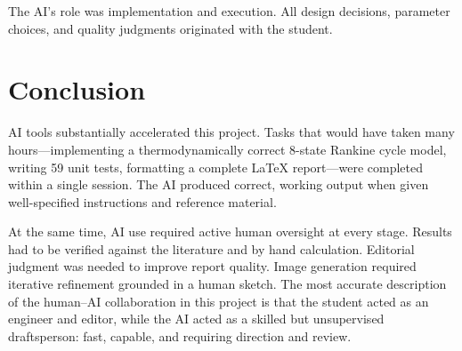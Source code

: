 \documentclass[12pt, letterpaper]{article}
\begin{document}
The AI's role was implementation and execution. All design decisions, parameter choices, and quality judgments originated with the student.

\section{Conclusion}

AI tools substantially accelerated this project. Tasks that would have taken many hours---implementing a thermodynamically correct 8-state Rankine cycle model, writing 59 unit tests, formatting a complete LaTeX report---were completed within a single session. The AI produced correct, working output when given well-specified instructions and reference material.

At the same time, AI use required active human oversight at every stage. Results had to be verified against the literature and by hand calculation. Editorial judgment was needed to improve report quality. Image generation required iterative refinement grounded in a human sketch. The most accurate description of the human--AI collaboration in this project is that the student acted as an engineer and editor, while the AI acted as a skilled but unsupervised draftsperson: fast, capable, and requiring direction and review.
\end{document}
